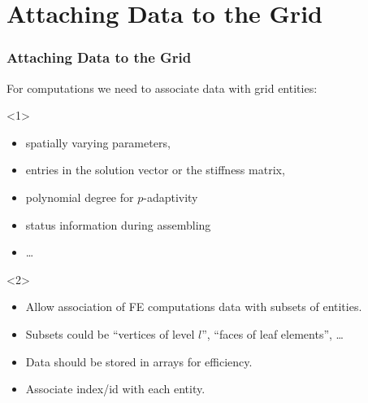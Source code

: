 \documentclass[ignorenonframetext,11pt]{beamer}
\theoremstyle{definition}
\begin{document}
\section{Attaching Data to the Grid}
\begin{frame} \frametitle{Attaching Data to the Grid}

  For computations we need to associate data with grid entities:

  \begin{onlyenv}<1>
  \begin{itemize}
  \item spatially varying parameters,
  \item entries in the solution vector or the stiffness matrix,
  \item polynomial degree for $p$-adaptivity
  \item status information during assembling
  \item \ldots
  \end{itemize}
  \end{onlyenv}

  \begin{onlyenv}<2>
  \begin{itemize}
  \item Allow association of FE computations data with subsets of entities.
  \item Subsets could be ``vertices of level $l$'', ``faces of leaf
    elements'', \ldots
  \item Data should be stored in arrays for efficiency.
  \item Associate index/id with each entity.
  \end{itemize}
  \end{onlyenv}

\end{frame}
\end{document}
